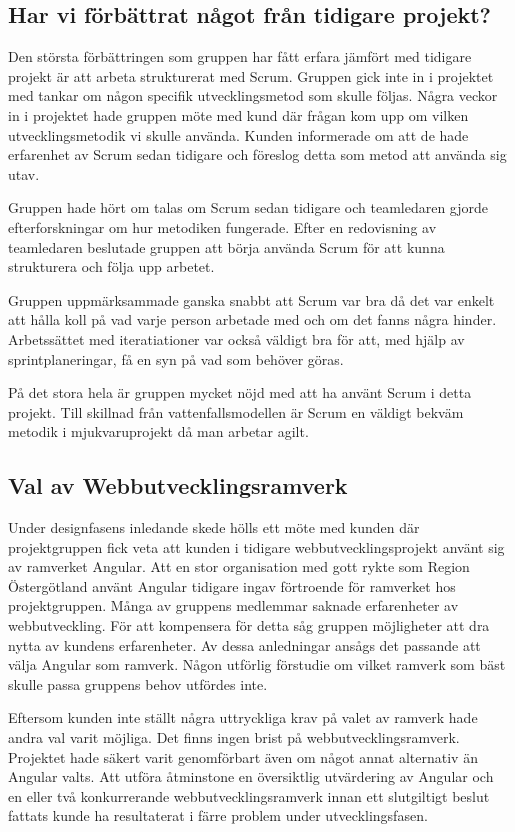 \subsection{Har vi förbättrat något från tidigare projekt?}

Den största förbättringen som gruppen har fått erfara jämfört med tidigare projekt är att arbeta strukturerat med Scrum. 
Gruppen gick inte in i projektet med tankar om någon specifik utvecklingsmetod som skulle följas. Några veckor in i projektet hade gruppen möte med kund där frågan kom upp om vilken utvecklingsmetodik vi skulle använda. 
Kunden informerade om att de hade erfarenhet av Scrum sedan tidigare och föreslog detta som metod att använda sig utav.

Gruppen hade hört om talas om Scrum sedan tidigare och teamledaren gjorde efterforskningar om hur metodiken fungerade. 
Efter en redovisning av teamledaren beslutade gruppen att börja använda Scrum för att kunna strukturera och följa upp arbetet. 

Gruppen uppmärksammade ganska snabbt att Scrum var bra då det var enkelt att hålla koll på vad varje person arbetade med och om det fanns några hinder. Arbetssättet med iteratiationer var också väldigt bra för att, med hjälp av sprintplaneringar, få en syn på vad som behöver göras. 

På det stora hela är gruppen mycket nöjd med att ha använt Scrum i detta projekt. Till skillnad från vattenfallsmodellen\cite{vattenfall} är Scrum en väldigt bekväm metodik i mjukvaruprojekt då man arbetar agilt.

\subsection{Val av Webbutvecklingsramverk}

Under designfasens inledande skede hölls ett möte med kunden där projektgruppen fick veta att kunden i tidigare webbutvecklingsprojekt använt sig av ramverket Angular. Att en stor organisation med gott rykte som Region Östergötland använt Angular tidigare ingav förtroende för ramverket hos projektgruppen. Många av gruppens medlemmar saknade erfarenheter av webbutveckling. För att kompensera för detta såg gruppen möjligheter att dra nytta av kundens erfarenheter. Av dessa anledningar ansågs det passande att välja Angular som ramverk. Någon utförlig förstudie om vilket ramverk som bäst skulle passa gruppens behov utfördes inte.

Eftersom kunden inte ställt några uttryckliga krav på valet av ramverk hade andra val varit möjliga. Det finns ingen brist på webbutvecklingsramverk. Projektet hade säkert varit genomförbart även om något annat alternativ än Angular valts. Att utföra åtminstone en översiktlig utvärdering av Angular och en eller två konkurrerande webbutvecklingsramverk innan ett slutgiltigt beslut fattats kunde ha resultaterat i färre problem under utvecklingsfasen.

